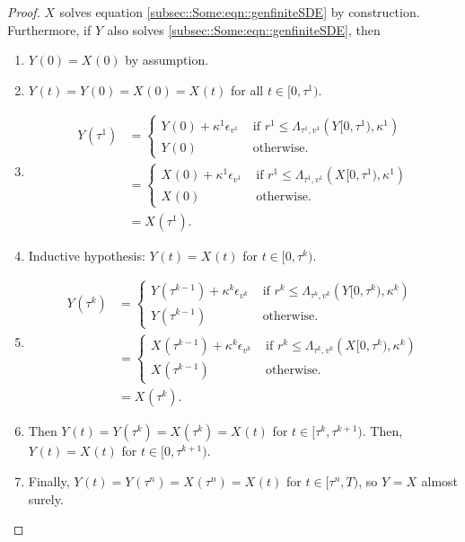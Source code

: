 \documentclass[12pt]{article}
\newcommand{\te}{\text}
\newcommand{\ep}{\epsilon}
\renewcommand{\v}{v}							%
\newcommand{\ev}[1]{\ep_{#1}}					%
\newcommand{\T}{T}								%
\renewcommand{\t}{t}							%
\renewcommand{\r}{r}								%
\newcommand{\rt}[1]{\tau^{#1}}						%
\renewcommand{\it}{k}								%
\newcommand{\numb}{n}								%
\newcommand{\rxvt}[2]{X_{#1}{(#2)}}					%
\newcommand{\rxvtt}[2]{Y_{#1}{(#2)}}				%
\newcommand{\rxvts}[2]{X_{#1}{#2}}					%
\newcommand{\rxvtts}[2]{Y_{#1}{#2}}					%
\newcommand{\ratee}[1]{\Lambda_{#1}}				%
\renewcommand{\mark}[1]{\kappa^{#1}}				%
\begin{document}
\begin{proof}
\(\rxvts{}{}\) solves equation \eqref{subsec::Some:eqn::genfiniteSDE} by construction. Furthermore, if \(\rxvtts{}{}\) also solves \eqref{subsec::Some:eqn::genfiniteSDE}, then 

\begin{enumerate}
\item \(\rxvtt{}{0} = \rxvt{}{0}\) by assumption.

\item \(\rxvtt{}{\t} = \rxvtt{}{0} = \rxvt{}{0} = \rxvt{}{\t}\) for all \(\t\in [0,\rt{1})\).

\item 

\begin{align*}
\rxvtt{}{\rt{1}} &= \begin{cases}
\rxvtt{}{0} + \mark{1}\ev{\v^1} &\te{ if } \r^1 \leq \ratee{\rt{1},\v^1}(\rxvtts{}{[0,\rt{1})},\mark{1})\\
\rxvtt{}{0} &\te{ otherwise.}
\end{cases}\\
&= \begin{cases}
\rxvt{}{0} + \mark{1}\ev{\v^1} &\te{ if } \r^1 \leq \ratee{\rt{1},\v^1}(\rxvts{}{[0,\rt{1})},\mark{1})\\
\rxvt{}{0} &\te{ otherwise.}
\end{cases}\\
&= \rxvt{}{\rt{1}}.
\end{align*}

\item Inductive hypothesis: \(\rxvtt{}{\t} = \rxvt{}{\t}\) for \(\t\in [0,\rt{\it})\). 

\item 

\begin{align*}
\rxvtt{}{\rt{\it}} &= \begin{cases}
\rxvtt{}{\rt{\it-1}} + \mark{\it}\ev{\v^\it} &\te{ if } \r^\it \leq \ratee{\rt{\it},\v^\it}(\rxvtts{}{[0,\rt{\it})},\mark{\it})\\
\rxvtt{}{\rt{\it-1}} &\te{ otherwise.}
\end{cases}\\
&= \begin{cases}
\rxvt{}{\rt{\it-1}} + \mark{\it}\ev{\v^\it} &\te{ if } \r^\it \leq \ratee{\rt{\it},\v^\it}(\rxvts{}{[0,\rt{\it})},\mark{\it})\\
\rxvt{}{\rt{\it-1}} &\te{ otherwise.}
\end{cases}\\
&= \rxvt{}{\rt{\it}}.
\end{align*}

\item Then \(\rxvtt{}{\t} = \rxvtt{}{\rt{\it}} = \rxvt{}{\rt{\it}} = \rxvt{}{\t}\) for \(\t \in [\rt{\it},\rt{\it+1})\). Then, \(\rxvtt{}{\t} = \rxvt{}{\t}\) for \(\t\in [0,\rt{\it+1})\).

\item Finally, \(\rxvtt{}{\t} = \rxvtt{}{\rt{\numb}} = \rxvt{}{\rt{\numb}} = \rxvt{}{\t}\) for \(\t\in [\rt{\numb},\T)\), so \(\rxvtts{}{} = \rxvts{}{}\) almost surely.
\end{enumerate}
\end{proof}
\end{document}
